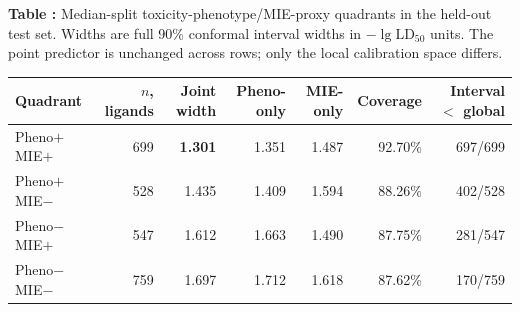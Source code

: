 \begin{center}
\label{tab:pheno_mie_quadrants}
\begin{minipage}{0.98\textwidth}
\textbf{Table \thetable:} Median-split toxicity-phenotype/MIE-proxy quadrants in the held-out test set. Widths are full 90\% conformal interval widths in $-\lg\mathrm{LD}_{50}$ units. The point predictor is unchanged across rows; only the local calibration space differs.
\par\vspace{0.5em}
\centering
\scriptsize
\setlength{\tabcolsep}{2.4pt}
\begin{tabular}{lrrrrrr}
\toprule
Quadrant & $n$, ligands & Joint width & Pheno-only & MIE-only & Coverage & Interval $<$ global \\
\midrule
Pheno$+$ MIE$+$ & 699 & \textbf{1.301} & 1.351 & 1.487 & 92.70\% & 697/699 \\
Pheno$+$ MIE$-$ & 528 & 1.435 & 1.409 & 1.594 & 88.26\% & 402/528 \\
Pheno$-$ MIE$+$ & 547 & 1.612 & 1.663 & 1.490 & 87.75\% & 281/547 \\
Pheno$-$ MIE$-$ & 759 & 1.697 & 1.712 & 1.618 & 87.62\% & 170/759 \\
\bottomrule
\end{tabular}
\end{minipage}
\end{center}
